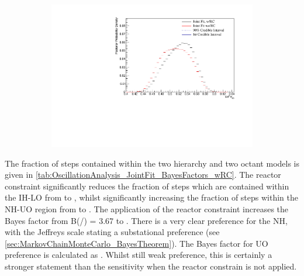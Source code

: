 \begin{figure}[h]
  \begin{subfigure}[t]{1.0\textwidth}
    \includegraphics[width=\textwidth, trim={0mm 0mm 0mm 0mm}, clip,page=1]{Figures/OA/JointFit_wRC_Comp/ContourComparison_1D_th23_BH_2_wRC_woRC_UnSmeared_CredibleInterval.pdf}
  \end{subfigure}
  \caption{}
  \label{fig:OscillationAnalysis_JointFit_wRC_Comp_TH23}
\end{figure}

The fraction of steps contained within the two hierarchy and two octant models is given in \autoref{tab:OscillationAnalysis_JointFit_BayesFactors_wRC}. The reactor constraint significantly reduces the fraction of steps which are contained within the IH-LO from  to , whilst significantly increasing the fraction of steps within the NH-UO region from  to . The application of the reactor constraint increases the Bayes factor from {B(/) = 3.67} to . There is a very clear preference for the NH, with the Jeffreys scale stating a substational preference (see \autoref{sec:MarkovChainMonteCarlo_BayesTheorem}). The Bayes factor for UO preference is calculated as  . Whilst still weak preference, this is certainly a stronger statement than the sensitivity when the reactor constrain is not applied.

